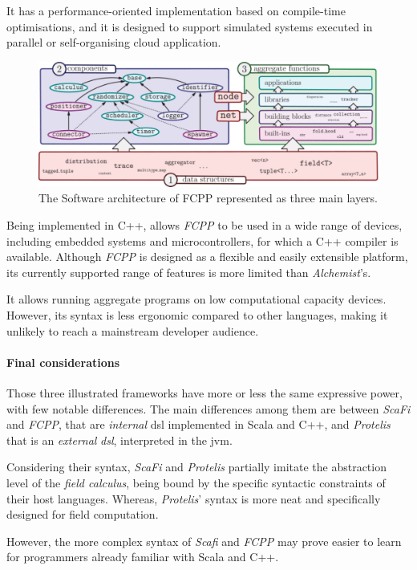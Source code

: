 It has a performance-oriented implementation based on compile-time optimisations, and it is designed to support
simulated systems executed in parallel or self-organising cloud application.

\begin{figure}
    \centering
    \includegraphics[width=.8\linewidth]{figures/fcpp-structure}
    \caption{The Software architecture of FCPP represented as three main layers.}
    \label{fig:fcpp-structure}
\end{figure}

Being implemented in C++, allows \emph{FCPP} to be used in a wide range of devices, including embedded systems and
microcontrollers, for which a C++ compiler is available.
Although \emph{FCPP} is designed as a flexible and easily extensible platform, its currently supported range of features
is more limited than \emph{Alchemist}'s.

It allows running aggregate programs on low computational capacity devices.
However, its syntax is less ergonomic compared to other languages, making it unlikely to reach a mainstream developer audience.

\paragraph{Final considerations}
Those three illustrated frameworks have more or less the same expressive power, with few notable differences.
The main differences among them are between \emph{ScaFi} and \emph{FCPP}, that are \emph{internal} \ac{dsl} implemented in Scala
and C++, and \emph{Protelis} that is an \emph{external} \emph{dsl}, interpreted in the \ac{jvm}.

Considering their syntax, \emph{ScaFi} and \emph{Protelis} partially imitate the abstraction level of the \emph{field calculus},
being bound by the specific syntactic constraints of their host languages.
Whereas, \emph{Protelis}' syntax is more neat and specifically designed for field computation.

However, the more complex syntax of \emph{Scafi} and \emph{FCPP} may prove easier to learn for programmers already familiar with Scala and C++.